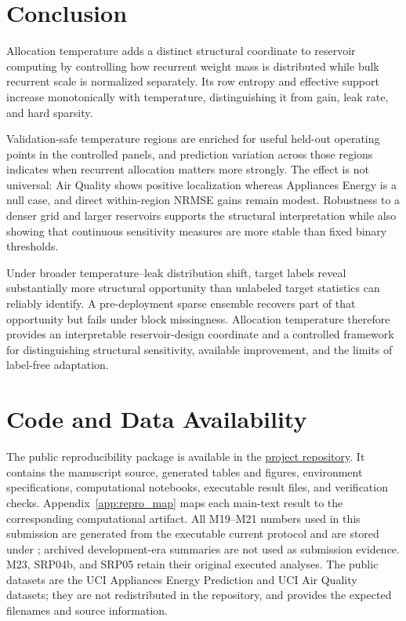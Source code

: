 \documentclass[preprint,12pt,authoryear]{elsarticle}
\begin{document}
\section{Conclusion}
\label{sec:conclusion}

Allocation temperature adds a distinct structural coordinate to reservoir computing by controlling how recurrent weight mass is distributed while bulk recurrent scale is normalized separately. Its row entropy and effective support increase monotonically with temperature, distinguishing it from gain, leak rate, and hard sparsity.

Validation-safe temperature regions are enriched for useful held-out operating points in the controlled panels, and prediction variation across those regions indicates when recurrent allocation matters more strongly. The effect is not universal: Air Quality shows positive localization whereas Appliances Energy is a null case, and direct within-region NRMSE gains remain modest. Robustness to a denser grid and larger reservoirs supports the structural interpretation while also showing that continuous sensitivity measures are more stable than fixed binary thresholds.

Under broader temperature--leak distribution shift, target labels reveal substantially more structural opportunity than unlabeled target statistics can reliably identify. A pre-deployment sparse ensemble recovers part of that opportunity but fails under block missingness. Allocation temperature therefore provides an interpretable reservoir-design coordinate and a controlled framework for distinguishing structural sensitivity, available improvement, and the limits of label-free adaptation.

\section*{Code and Data Availability}

The public reproducibility package is available in the \href{https://github.com/ildefons/temperature-calibrated-reservoirs}{project repository}. It contains the manuscript source, generated tables and figures, environment specifications, computational notebooks, executable result files, and verification checks. Appendix~\ref{app:repro_map} maps each main-text result to the corresponding computational artifact. All M19--M21 numbers used in this submission are generated from the executable current protocol and are stored under ; archived development-era summaries are not used as submission evidence. M23, SRP04b, and SRP05 retain their original executed analyses. The public datasets are the UCI Appliances Energy Prediction and UCI Air Quality datasets; they are not redistributed in the repository, and  provides the expected filenames and source information.
\end{document}
